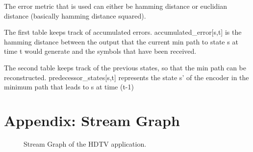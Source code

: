 \documentclass{article}
\begin{document}
The error metric that is used can either be hamming distance or euclidian distance (basically
hamming distance squared).

The first table keeps track of accumulated errors. accumulated\_error[s,t] is the hamming distance
between the output that the current min path to state s at time t would generate and the
symbols that have been received. 

The second table keeps track of the previous states, so that the min path
can be reconstructed. predecessor\_states[s,t] represents the state s' of the encoder
in the minimum path that leads to s at time (t-1) 




\begin{small}


\end{small}


\section{Appendix: Stream Graph}

\begin{landscape}
\begin{figure}
\center
\epsfxsize=11in
\caption{Stream Graph of the HDTV application.}
\label{fig:hdtv-stream-graph}
\end{figure}
\end{landscape}
\end{document}
